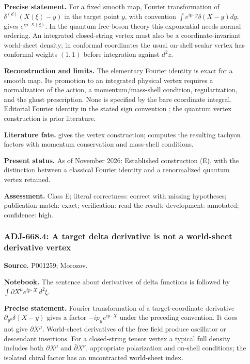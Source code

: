 \noindent\textbf{Precise statement.} For a fixed smooth map, Fourier transformation of \(\delta^{(d)}(X(\xi)-y)\) in the target point \(y\), with convention \(\int e^{ip\cdot y}\delta(X-y)dy\), gives \(e^{ip\cdot X(\xi)}\). In the quantum free-boson theory this exponential needs normal ordering. An integrated closed-string vertex must also be a coordinate-invariant world-sheet density; in conformal coordinates the usual on-shell scalar vertex has conformal weights \((1,1)\) before integration against \(d^2z\).\par

\noindent\textbf{Reconstruction and limits.} The elementary Fourier identity is exact for a smooth map. Its promotion to an integrated physical vertex requires a normalization of the action, a momentum/mass-shell condition, regularization, and the ghost prescription. None is specified by the bare coordinate integral. Editorial Fourier identity in the stated sign convention \oursComputed; the quantum vertex construction is prior literature.\par

\noindent\textbf{Literature fate.} \citet[eqs.~(26)--(31)]{polyakov1981quantum} gives the vertex construction; \citet[\S6, (6.21)--(6.26)]{belavinknizhnik1986complex} computes the resulting tachyon factors with momentum conservation and mass-shell conditions.\par

\noindent\textbf{Present status.} As of November 2026: Established construction (E), with the distinction between a classical Fourier identity and a renormalized quantum vertex retained.\par

\noindent\textbf{Assessment.} Class E; literal correctness: correct with missing hypotheses; publication match: exact; verification: read the result; development: annotated; confidence: high.\par

\subsubsection{ADJ-668.4: A target delta derivative is not a world-sheet derivative vertex}
\noindent\textbf{Source.} P001259; Morozov.\par
\noindent\textbf{Notebook.} The sentence about derivatives of delta functions is followed by \(\int\partial X^\mu e^{ip\cdot X}\,d^2\xi\).\par

\noindent\textbf{Precise statement.} Fourier transformation of a target-coordinate derivative \(\partial_{y^\mu}\delta(X-y)\) gives a factor \(-ip_\mu e^{ip\cdot X}\) under the preceding convention. It does not give \(\partial X^\mu\). World-sheet derivatives of the free field produce oscillator or descendant insertions. For a closed-string tensor vertex a typical full density includes both \(\partial X^\mu\) and \(\bar\partial X^\nu\), appropriate polarization and on-shell conditions; the isolated chiral factor has an uncontracted world-sheet index.\par

